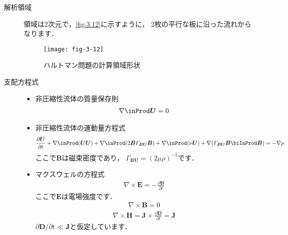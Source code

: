 \begin{description}
 \item[解析領域] 領域は2次元で，\autoref{fig:3.12}に示すように，
            2枚の平行な板に沿った流れからなります．


\begin{figure}[ht]
 \texttt{[image: fig-3-12]}
 \caption{ハルトマン問題の計算領域形状}
 \label{fig:3.12}
\end{figure}


 \item[支配方程式] \mbox{}
            \begin{itemize}
             \item 非圧縮性流体の質量保存則
                   \begin{align}
                    \label{eq:3.19}
                    \nabla \inProd \bm{U} = 0
                   \end{align}
             \item 非圧縮性流体の運動量方程式
                   \begin{align}
                    \label{eq:3.20}
                    \frac{\partial\bm{U}}{\partial t}
                    + \nabla \inProd (\bm{U}\bm{U})
                    + \nabla \inProd (2\bm{B}\varGamma_{\bm{BU}}\bm{B})
                    + \nabla \inProd (\nu\bm{U})
                    + \nabla (\varGamma_{\bm{BU}}\bm{B} \biInProd \bm{B})
                    = -\nabla p
                   \end{align}
                   ここで$\bm{B}$は磁束密度であり，
                   $\varGamma_{\bm{BU}} = (2\mu\rho)^{-1}$です．
             \item マクスウェルの方程式
                   \begin{align}
                    \label{eq:3.21}
                    \nabla \times \bm{E} = -\frac{\partial\bm{B}}{\partial t}
                   \end{align}
                   ここで$\bm{E}$は電場強度です．
                   \begin{align}
                    \label{eq:3.22}
                    \nabla \times \bm{B} = 0
                   \end{align}
                   \begin{align}
                    \label{eq:3.23}
                    \nabla \times \bm{H}
                    = \bm{J} + \frac{\partial\bm{D}}{\partial t}
                    = \bm{J}
                   \end{align}
                   $\partial\bm{D}/\partial t \ll \bm{J}$と仮定しています．

\end{itemize}
\end{description}
